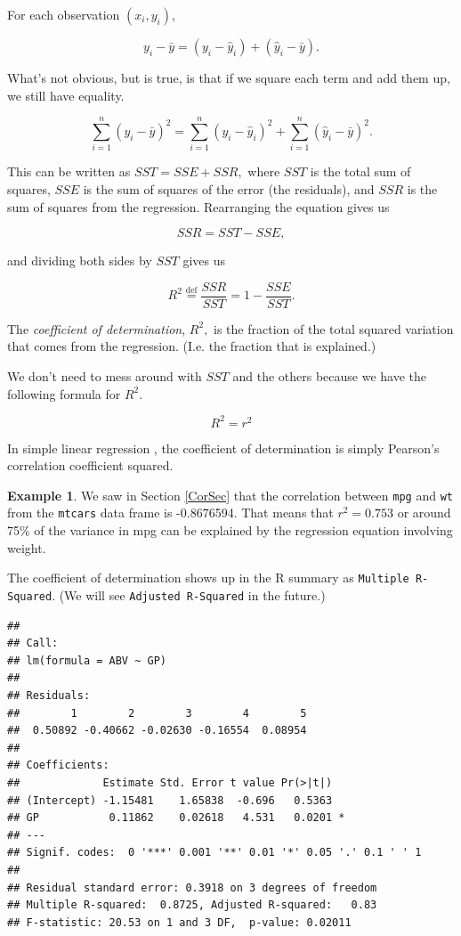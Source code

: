 \documentclass[
]{book}
\theoremstyle{definition}
\theoremstyle{definition}
\newtheorem{example}{Example}[chapter]
\theoremstyle{definition}
\theoremstyle{definition}
\theoremstyle{remark}
\begin{document}
For each observation \((x_i,y_i),\)

\[y_i-\bar{y}=(y_i-\hat{y}_i)+(\hat{y}_i-\bar{y}).\]

What's not obvious, but is true, is that if we square each term and add them up, we still have equality.

\begin{equation}
\sum_{i=1}^n (y_i-\bar{y})^2=\sum_{i=1}^n(y_i-\hat{y}_i)^2+\sum_{i=1}^n (\hat{y}_i-\bar{y})^2.
\label{eq:AnovaIdentity}
\end{equation}

This can be written as \(SST=SSE+SSR,\) where \(SST\) is the total sum of squares, \(SSE\) is the sum of squares of the error (the residuals), and \(SSR\) is the sum of squares from the regression. Rearranging the equation gives us

\[SSR=SST-SSE,\]

and dividing both sides by \(SST\) gives us

\[R^2\overset{\mathrm{def}}{=}\frac{SSR}{SST}=1-\frac{SSE}{SST}.\]

The \emph{coefficient of determination}, \(R^2,\) is the fraction of the total squared variation that comes from the regression. (I.e. the fraction that is explained.)

We don't need to mess around with \(SST\) and the others because we have the following formula for \(R^2.\)

\[R^2=r^2\]

In simple linear regression , the coefficient of determination is simply Pearson's correlation coefficient squared.

\begin{examplebox}

\begin{example}
We saw in Section \ref{CorSec} that the correlation between \texttt{mpg} and \texttt{wt} from the \texttt{mtcars} data frame is -0.8676594. That means that \(r^2=0.753\) or around 75\% of the variance in mpg can be explained by the regression equation involving weight.
\end{example}

\end{examplebox}

The coefficient of determination shows up in the R summary as \texttt{Multiple\ R-Squared}. (We will see \texttt{Adjusted\ R-Squared} in the future.)

\begin{verbatim}
## 
## Call:
## lm(formula = ABV ~ GP)
## 
## Residuals:
##        1        2        3        4        5 
##  0.50892 -0.40662 -0.02630 -0.16554  0.08954 
## 
## Coefficients:
##             Estimate Std. Error t value Pr(>|t|)  
## (Intercept) -1.15481    1.65838  -0.696   0.5363  
## GP           0.11862    0.02618   4.531   0.0201 *
## ---
## Signif. codes:  0 '***' 0.001 '**' 0.01 '*' 0.05 '.' 0.1 ' ' 1
## 
## Residual standard error: 0.3918 on 3 degrees of freedom
## Multiple R-squared:  0.8725, Adjusted R-squared:   0.83 
## F-statistic: 20.53 on 1 and 3 DF,  p-value: 0.02011
\end{verbatim}
\end{document}
